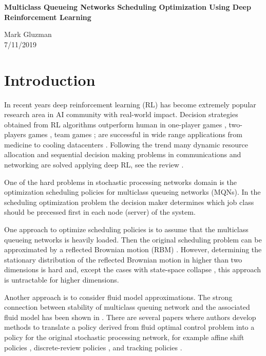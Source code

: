 \documentclass[11pt]{article}
\theoremstyle{definition}
\numberwithin{equation}{section}
\begin{document}
\begin{center}
  \large \bf
Multiclass Queueing Networks Scheduling Optimization Using Deep Reinforcement Learning
\end{center}
\begin{center}
  Mark Gluzman \\
  7/11/2019
\end{center}






\section{Introduction}



In recent years deep reinforcement learning (RL) has become extremely popular research area in AI community with real-world impact. Decision strategies obtained from RL algorithms outperform human in one-player games \cite{Bellemare2013, Mnih2015}, two-players games \cite{Silver2017},  team games \cite{OpenAI2019}; are successful in wide range applications from medicine \cite{Komorowski2018} to  cooling datacenters \cite{DeepMind2016a}. Following the trend many dynamic resource allocation and sequential decision making problems in communications and networking are solved applying deep RL, see the review \cite{CongLuong}.



 One of the hard problems in stochastic processing networks domain is the optimization scheduling policies for multiclass queueing networks (MQNs). %
 In the scheduling optimization problem the decision maker determines which job class should be precessed first in each node (server) of the system.

One approach to optimize scheduling policies is to assume that the multiclass queueing networks is heavily
loaded. Then the original scheduling problem can be approximated by a reflected Brownian motion (RBM) \cite{Harrison1988, Harrison1989, Wein1990}.  However, determining the stationary distribution of the reflected Brownian motion in higher than two dimensions is hard and, except the cases with state-space collapse \cite{Williams1998, Laws1990}, this approach is untractable for higher dimensions.

Another approach is to consider fluid model approximations. The strong connection between stability of multiclass queuing network and the associated fluid model has been shown in \cite{Dai1995}. There are several papers where authors develop methods to
translate a policy derived from fluid optimal control problem into a policy for the original stochastic processing network, for example affine shift policies \cite{Meyn1997}, discrete-review policies \cite{Maglaras2000}, and tracking policies \cite{Bauerle2001a}.
\end{document}
